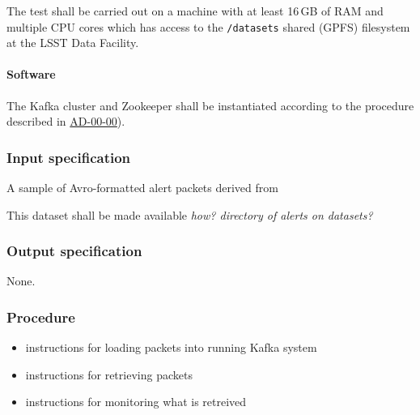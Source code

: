 The test shall be carried out on a machine with at least 16\,GB of RAM and
multiple CPU cores which has access to the \texttt{/datasets} shared (GPFS)
filesystem at the LSST Data Facility.

\paragraph{Software}

The Kafka cluster and Zookeeper shall be instantiated according to the 
procedure described in \hyperref[ad-00-00]{AD-00-00}).

\subsubsection{Input specification}

A sample of Avro-formatted alert packets derived from 

This dataset shall be made available \textit{how?  directory of alerts on datasets?}

\subsubsection{Output specification}

None.

\subsubsection{Procedure}

\begin{itemize}

  \item{instructions for loading packets into running Kafka system}

  \item{instructions for retrieving packets}

  \item{instructions for monitoring what is retreived}

\end{itemize}
